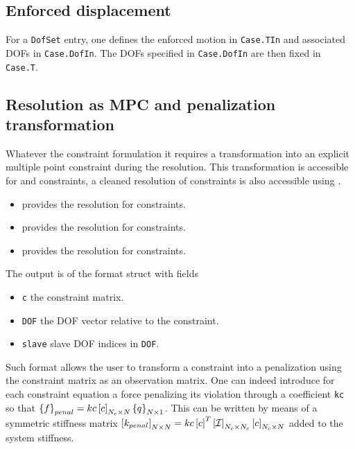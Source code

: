 \subsection{Enforced displacement} %


For a {\tt DofSet} entry, one defines the enforced motion in {\tt Case.TIn} and associated DOFs in {\tt Case.DofIn}. The DOFs specified in {\tt Case.DofIn} are then fixed in {\tt Case.T}.


\subsection{Resolution as MPC and penalization transformation} %

Whatever the constraint formulation it requires a transformation into an explicit multiple point constraint during the resolution. This transformation is accessible for  and \rigid constraints, a cleaned resolution of  constraints is also accessible using \fempc.

\begin{itemize}
\item {} provides the resolution for  constraints.
\item {} provides the resolution for \rigid constraints.
\item {} provides the resolution for  constraints.
\end{itemize}

The output is of the format struct with fields

\begin{itemize}
\item {\tt c} the constraint matrix.
\item {\tt DOF} the DOF vector relative to the constraint.
\item {\tt slave} slave DOF indices in {\tt DOF}.
\end{itemize}

Such format allows the user to transform a constraint into a penalization using the constraint matrix as an observation matrix. One can indeed introduce for each constraint equation a force penalizing its violation through a coefficient {\tt kc} so that $\left\{f\right\}_{penal} = kc \left[c\right]_{N_c \times N} \left\{q\right\}_{N \times 1}$. This can be written by means of a symmetric stiffness matrix $\left[k_{penal}\right]_{N \times N} = kc \left[c\right]^T \left[\mathcal{I}\right]_{N_c \times N_c} \left[c\right]_{N_c \times N}$ added to the system stiffness.


